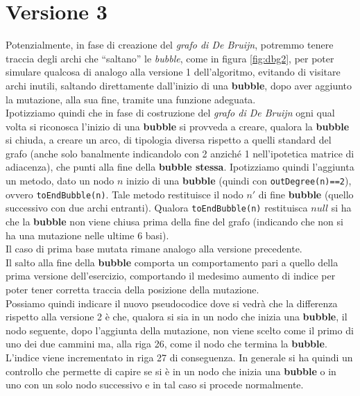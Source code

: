 \documentclass[a4paper,12pt, oneside]{book}
\begin{document}
\section{Versione 3}
Potenzialmente, in fase di creazione del \textit{grafo di De Bruijn}, potremmo
tenere traccia degli archi che ``saltano'' le \textit{bubble}, come in figura
\ref{fig:dbg2}, per poter simulare qualcosa di analogo alla versione 1
dell'algoritmo, evitando di visitare archi inutili, saltando direttamente
dall'inizio di una \textbf{bubble}, dopo aver aggiunto la mutazione, alla sua
fine, tramite una funzione adeguata. \\
Ipotizziamo quindi che in fase di costruzione del \textit{grafo di De Bruijn}
ogni qual volta si riconosca l'inizio di una \textbf{bubble} si provveda a
creare, qualora la \textbf{bubble} si chiuda, a creare un arco, di tipologia
diversa rispetto a quelli standard del grafo (anche solo banalmente indicandolo
con 2 anziché 1 nell'ipotetica matrice di adiacenza), che punti alla fine della
\textbf{bubble stessa}. Ipotizziamo quindi l'aggiunta un metodo, dato un
nodo $n$ inizio di una \textbf{bubble} (quindi con \texttt{outDegree(n)==2}),
ovvero 
\texttt{toEndBubble(n)}. Tale metodo restituisce il nodo $n'$ di fine
\textbf{bubble} (quello successivo con due archi entranti). Qualora
\texttt{toEndBubble(n)} restituisca $null$ si ha che la \textbf{bubble} non
viene chiusa prima della fine del grafo (indicando che non si ha una mutazione
nelle ultime 6 basi).\\
Il caso di prima base mutata rimane analogo alla versione precedente.\\
Il salto alla fine della \textbf{bubble} comporta un comportamento pari a quello
della prima versione dell'esercizio, comportando il medesimo aumento di indice
per poter tener corretta traccia della posizione della mutazione.\\
Possiamo quindi indicare il nuovo pseudocodice dove si vedrà che  la differenza
rispetto alla versione 2 è che, qualora si sia in un 
nodo che inizia una \textbf{bubble}, il nodo seguente, dopo l'aggiunta della
mutazione, non viene scelto come il primo di uno dei due cammini ma, alla riga
26, come il nodo che termina la \textbf{bubble}. L'indice viene incrementato in
riga 27 di conseguenza. In generale si ha quindi un controllo che permette di
capire se si è in un nodo che inizia una \textbf{bubble} o in uno con un solo
nodo successivo e in tal caso si procede normalmente.
\end{document}
